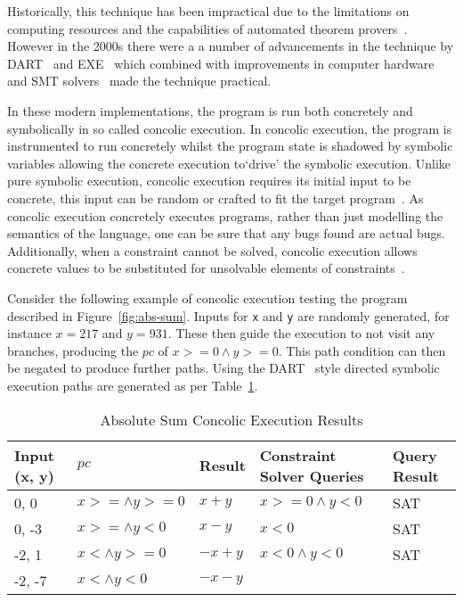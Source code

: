 \documentclass[]{final_report}
\begin{document}
Historically, this technique has been impractical due to the limitations on computing resources and the capabilities of automated theorem provers~\cite{king1976symbolic}. However in the 2000s there were a a number of advancements in the technique by DART~\cite{godefroid2005dart} and EXE~\cite{cadar2008exe} which combined with improvements in computer hardware and SMT solvers~\cite{de2011satisfiability} made the technique practical.

In these modern implementations, the program is run both concretely and symbolically in so called concolic execution. In concolic execution, the program is instrumented to run concretely whilst the program state is shadowed by symbolic variables allowing the concrete execution to`drive' the symbolic execution. Unlike pure symbolic execution, concolic execution requires its initial input to be concrete, this input can be random or crafted to fit the target program~\cite{godefroid2008grammar,cadar2013symbolic}. As concolic execution concretely executes programs, rather than just modelling the semantics of the language, one can be sure that any bugs found are actual bugs. Additionally, when a constraint cannot be solved, concolic execution allows concrete values to be substituted for unsolvable elements of constraints~\cite{sen2007concolic,sen2005cute}.

Consider the following example of concolic execution testing the program described in Figure~\ref{fig:abs-sum}. Inputs for \lstinline{x} and \lstinline{y} are randomly generated, for instance $x=217$ and $y=931$. These then guide the execution to not visit any branches, producing the $pc$ of $x >= 0 \land y >=0$. This path condition can then be negated to produce further paths. Using the DART~\cite{godefroid2005dart} style directed symbolic execution paths are generated as per Table~\ref{abs-sum-ce-table}.

\begin{table}[]
\centering
\begin{tabular}{|l|l|l|l|l|}
\hline
Input (x, y) & $pc$ & Result & Constraint Solver Queries & Query Result \\ \hline
0, 0 & $x >= \land y >= 0$ & $x+y$ & $x >=0 \land y < 0 $ & SAT \\ \hline
0, -3 & $x >= \land y < 0$ & $x - y$ & $x <0 $ & SAT \\ \hline
-2, 1 & $x < \land y >= 0$ & $-x+y$ & $x<0 \land y < 0 $ & SAT \\ \hline
-2, -7 & $x < \land y < 0$ & $-x-y$ &  &  \\ \hline
\end{tabular}
\caption{Absolute Sum Concolic Execution Results}
\label{abs-sum-ce-table}
\end{table}
\end{document}
